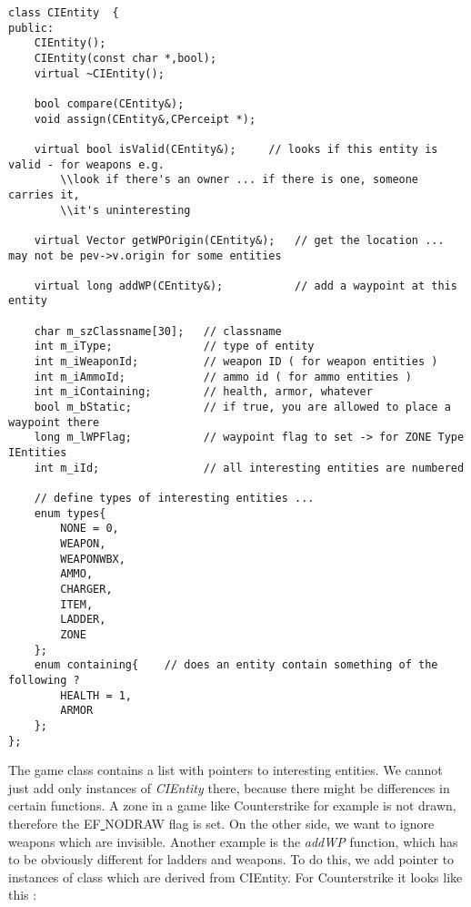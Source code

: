 \documentclass[12pt]{article}
\begin{document}
\scriptsize
\linespread{1.0}
\begin{verbatim}
class CIEntity  {
public:
    CIEntity();
    CIEntity(const char *,bool);
    virtual ~CIEntity();

    bool compare(CEntity&);
    void assign(CEntity&,CPerceipt *);

    virtual bool isValid(CEntity&);		// looks if this entity is valid - for weapons e.g.
        \\look if there's an owner ... if there is one, someone carries it,
        \\it's uninteresting

    virtual Vector getWPOrigin(CEntity&);	// get the location ... may not be pev->v.origin for some entities

    virtual long addWP(CEntity&);			// add a waypoint at this entity

    char m_szClassname[30];   // classname
    int m_iType;              // type of entity
    int m_iWeaponId;          // weapon ID ( for weapon entities )
    int m_iAmmoId;            // ammo id ( for ammo entities )
    int m_iContaining;        // health, armor, whatever
    bool m_bStatic;           // if true, you are allowed to place a waypoint there
    long m_lWPFlag;           // waypoint flag to set -> for ZONE Type IEntities
    int m_iId;                // all interesting entities are numbered

    // define types of interesting entities ...
    enum types{
        NONE = 0,
        WEAPON,
        WEAPONWBX,
        AMMO,
        CHARGER,
        ITEM,
        LADDER,
        ZONE
    };
    enum containing{	// does an entity contain something of the following ?
        HEALTH = 1,
        ARMOR
    };
};
\end{verbatim}
\linespread{1.3}
\normalsize

The game class contains a list with pointers to interesting entities. We cannot just add only instances of \textit{CIEntity} there, because there might be differences in certain functions. A zone in a game like Counterstrike for example is not drawn, therefore the EF\underline{ }NODRAW flag is set. On the other side, we want to ignore weapons which are invisible. Another example is the \textit{addWP} function, which has to be obviously different for ladders and weapons. To do this, we add pointer to instances of class which are derived from CIEntity. For Counterstrike it looks like this :
\end{document}
